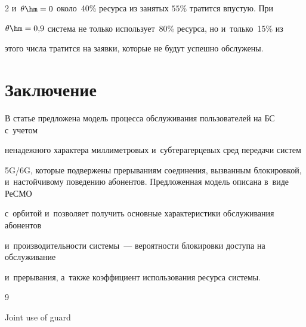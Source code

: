 \begin{multicols}{2}
и~$\theta\hm=0$ около~40\% ресурса из занятых $55$\% тратится впустую. При 

$\theta\hm=0{,}9$ сис\-те\-ма не только использует~80\% ресурса, но и~только~15\% из 

этого чис\-ла тратится на заявки, которые не будут успеш\-но об\-слу\-жены. 











\section{Заключение}




В статье предложена модель процесса обслуживания пользователей на БС с~учетом 

не\-на\-деж\-но\-го характера мил\-ли\-мет\-ро\-вых и~субтерагерцевых сред передачи сис\-тем 

5G/6G, которые подвержены прерываниям со\-еди\-не\-ния, вызванным блокировкой, и~настойчивому поведению абонентов. Предложенная модель описана в~виде РеСМО 

с~орбитой и~поз\-во\-ля\-ет получить основные характеристики обслуживания абонентов 

и~про\-из\-во\-ди\-тель\-ности сис\-те\-мы~--- вероятности блокировки до\-сту\-па на обслуживание 

и~прерывания, а~так\-же коэффициент использования ресурса сис\-темы.

{



}









{\small\frenchspacing

 {\baselineskip=12pt


 \begin{thebibliography}{9}


 Joint use of guard 


\end{thebibliography}}}
\end{multicols}
